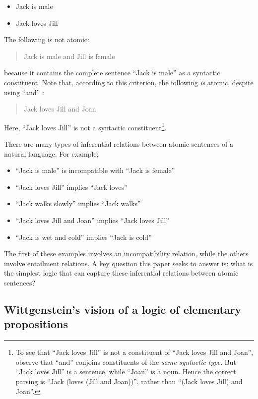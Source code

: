 \begin{itemize}

\item Jack is male
\item Jack loves Jill
\end{itemize}

\NI The following is not atomic:

\begin{quote}
  Jack is male and Jill is female
\end{quote}

\NI because it contains the complete sentence ``Jack is male'' as a
syntactic constituent.  Note that, according to this criterion, the
following \emph{is} atomic, despite using ``and'' :

\begin{quote}
  Jack loves Jill and Joan
\end{quote}

\NI Here, ``Jack loves Jill'' is not a syntactic constituent\footnote{To see that ``Jack loves Jill'' is not a constituent of ``Jack loves Jill and Joan'', observe that ``and'' conjoins constituents of the \emph{same syntactic type}. But ``Jack loves Jill'' is a sentence, while ``Joan'' is a noun. Hence the correct parsing is ``Jack (loves (Jill and Joan))'', rather than ``(Jack loves Jill) and Joan''.}.

There are many types of inferential relations between atomic
sentences of a natural language.  For example:

\begin{itemize}

\item ``Jack is male'' is incompatible with ``Jack is female''
\item ``Jack loves Jill'' implies ``Jack loves''
\item ``Jack walks slowly'' implies ``Jack walks''
\item ``Jack loves Jill and Joan'' implies ``Jack loves Jill''
\item ``Jack is wet and cold'' implies ``Jack is cold''

\end{itemize}

\NI The first of these examples involves an incompatibility relation,
while the others involve entailment relations.  A key question this
paper seeks to answer is: what is the simplest logic that can capture
these inferential relations between atomic sentences?

\subsection{Wittgenstein's vision of a logic of elementary propositions}

